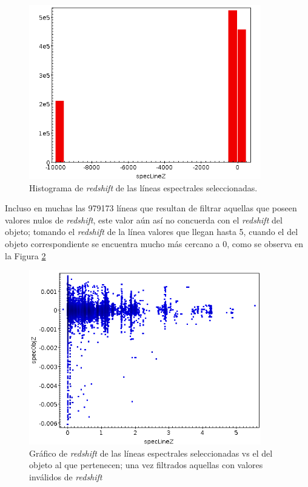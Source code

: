 \begin{figure}[h!]
\begin{center}
\includegraphics[width=0.9\textwidth]{imagenes/speclinez_hist.png}
\end{center}
\vspace*{-5mm}
\caption{Histograma de \textit{redshift} de las líneas espectrales seleccionadas.}
\label{fig:speclinez_hist}
\end{figure}

Incluso en muchas las 979173 líneas que resultan de filtrar aquellas que poseen valores nulos de \textit{redshift}, este valor aún así no concuerda con el \textit{redshift} del objeto; tomando el \textit{redshift} de la línea valores que llegan hasta 5, cuando el del objeto correspondiente se encuentra mucho más cercano a 0, como se observa en la Figura \ref{fig:specobjz_vs_speclinez}

\begin{figure}[h!]
\begin{center}
\includegraphics[width=0.9\textwidth]{imagenes/specobjz_vs_speclinez.png}
\end{center}
\vspace*{-5mm}
\caption{Gráfico de \textit{redshift} de las líneas espectrales seleccionadas vs el del objeto al que pertenecen; una vez filtrados aquellas con valores inválidos de \textit{redshift}}
\label{fig:specobjz_vs_speclinez}
\end{figure}

